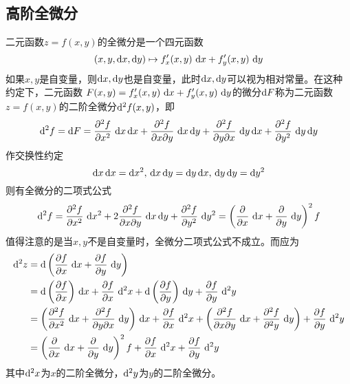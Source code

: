 \subsection{高阶全微分}
二元函数$z=f(x,y)$的全微分是一个四元函数
\[ (x,y,\mathop{}\!\mathrm{d} x,\mathop{}\!\mathrm{d} y)\mapsto f'_x(x,y)\,\mathop{}\!\mathrm{d} x + f'_y(x,y)\,\mathop{}\!\mathrm{d} y \]
如果$x,y$是自变量，则$\mathop{}\!\mathrm{d} x,\mathop{}\!\mathrm{d} y$也是自变量，此时$\mathop{}\!\mathrm{d} x,\mathop{}\!\mathrm{d} y$可以视为相对常量。在这种约定下，二元函数
$F(x,y)=f'_x(x,y)\,\mathop{}\!\mathrm{d} x+ f'_y(x,y)\,\mathop{}\!\mathrm{d} y$的微分$\mathop{}\!\mathrm{d} F$称为二元函数$z=f(x,y)$的二阶全微分$\mathop{}\!\mathrm{d}^2f(x,y)$，即
\begin{equation}
    \diff^2 f
    = \diff F
    = \frac{\partial^2 f}{\partial x^2}\,\diff x\diff x
    + \frac{\partial^2 f}{\partial x\partial y}\,\diff x\diff y
    + \frac{\partial^2 f}{\partial y\partial x}\,\diff y\diff x
    + \frac{\partial^2 f}{\partial y^2}\,\diff y\diff y
\end{equation}
作交换性约定
\[
    \diff x\diff x = \diff x^2,\, \diff x\diff y= \diff y\diff x,\, \diff y\diff y=\diff y^2
\]
则有全微分的二项式公式
\begin{equation}
    \mathop{}\!\mathrm{d}^2 f
    = \frac{\partial^2 f}{\partial x^2}\,\mathop{}\!\mathrm{d} x^2
    + 2\frac{\partial^2 f}{\partial x\partial y}\,\mathop{}\!\mathrm{d} x\mathop{}\!\mathrm{d} y
    + \frac{\partial^2 f}{\partial y^2}\,\mathop{}\!\mathrm{d} y^2
    = \left(\frac{\partial}{\partial x}\,\mathop{}\!\mathrm{d} x + \frac{\partial}{\partial y}\,\mathop{}\!\mathrm{d} y\right)^2 f
\end{equation}
值得注意的是当$x,y$不是自变量时，全微分二项式公式不成立。而应为
\begin{equation}
    \begin{split}
        \diff^2 z
        &= \diff \left(\frac{\partial f}{\partial x}\,\diff x + \frac{\partial f}{\partial y}\,\diff y\right)                    \\
        &= \diff\left(\frac{\partial f}{\partial x}\right)\,\diff x
        + \frac{\partial f}{\partial x}\,\diff^2 x
        + \diff\left(\frac{\partial f}{\partial y}\right)\,\diff y
        + \frac{\partial f}{\partial y}\,\diff^2 y                                                                                 \\
        &= \left(\frac{\partial^2 f}{\partial x^2}\,\diff x + \frac{\partial^2 f}{\partial y\partial x}\,\diff y\right)\,\diff x
        + \frac{\partial f}{\partial x}\,\diff^2 x
        + \left(\frac{\partial^2 f}{\partial x\partial y}\,\diff x + \frac{\partial^2 f}{\partial^2 y}\,\diff y\right)
        + \frac{\partial f}{\partial y}\,\diff^2 y                                                                                 \\
        &= \left(\frac{\partial}{\partial x}\,\diff x + \frac{\partial}{\partial y}\,\diff y\right)^2 f
        + \frac{\partial f}{\partial x}\,\diff^2 x
        + \frac{\partial f}{\partial y}\,\diff^2 y
    \end{split}
\end{equation}
其中$\mathop{}\!\mathrm{d}^2 x$为$x$的二阶全微分，$\mathop{}\!\mathrm{d}^2 y$为$y$的二阶全微分。


